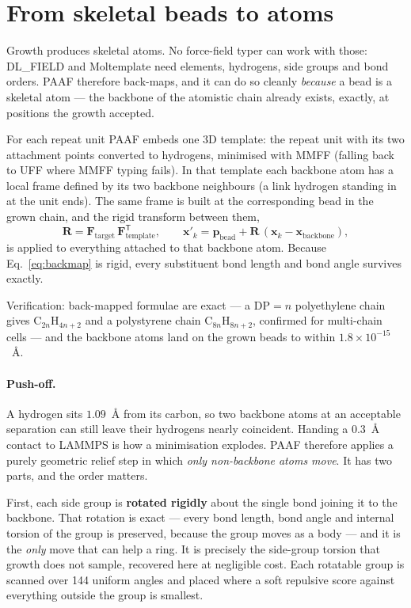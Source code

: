 \documentclass[11pt,a4paper]{article}
\begin{document}
\section{From skeletal beads to atoms}
\label{sec:backmap}

Growth produces skeletal atoms. No force-field typer can work with those: DL\_FIELD
and Moltemplate need elements, hydrogens, side groups and bond orders. PAAF
therefore back-maps, and it can do so cleanly \emph{because} a bead is a
skeletal atom --- the backbone of the atomistic chain already exists, exactly,
at positions the growth accepted.

For each repeat unit PAAF embeds one 3D template: the repeat unit with its two
attachment points converted to hydrogens, minimised with MMFF (falling back
to UFF where MMFF typing fails). In that template
each backbone atom has a local frame defined by its two backbone neighbours
(a link hydrogen standing in at the unit ends). The same frame is built at the
corresponding bead in the grown chain, and the rigid transform between them,
\begin{equation}
  \mathbf{R} = \mathbf{F}_{\text{target}}\,\mathbf{F}_{\text{template}}^{\mathsf{T}},
  \qquad
  \mathbf{x}'_k = \mathbf{p}_{\text{bead}} + \mathbf{R}\,
  (\mathbf{x}_k - \mathbf{x}_{\text{backbone}}),
  \label{eq:backmap}
\end{equation}
is applied to everything attached to that backbone atom. Because
Eq.~\eqref{eq:backmap} is rigid, every substituent bond length and bond angle
survives exactly.

Verification: back-mapped formulae are exact --- a $\mathrm{DP}=n$
polyethylene chain gives C$_{2n}$H$_{4n+2}$ and a polystyrene chain
C$_{8n}$H$_{8n+2}$, confirmed for multi-chain cells --- and the backbone atoms
land on the grown beads to within $1.8\times10^{-15}$~\AA.

\paragraph{Push-off.} A hydrogen sits $1.09$~\AA{} from its carbon, so two
backbone atoms at an acceptable separation can still leave their hydrogens
nearly coincident. Handing a $0.3$~\AA{} contact to LAMMPS is how a
minimisation explodes. PAAF therefore applies a purely geometric relief step
in which \emph{only non-backbone atoms move}. It has two parts, and the order
matters.

First, each side group is \textbf{rotated rigidly} about the single bond
joining it to the backbone. That rotation is exact --- every bond length, bond
angle and internal torsion of the group is preserved, because the group moves
as a body --- and it is the \emph{only} move that can help a ring. It is
precisely the side-group torsion that growth does not sample, recovered here
at negligible cost. Each rotatable group is scanned over 144 uniform angles and
placed where a soft repulsive score against everything outside the group is
smallest.
\end{document}
